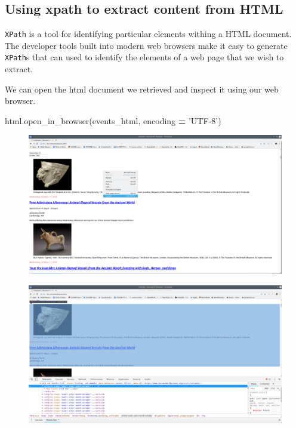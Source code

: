 \documentclass[]{book}
\newenvironment{Shaded}{\begin{snugshade}}{\end{snugshade}}
\newcommand{\StringTok}[1]{\textcolor[rgb]{0.31,0.60,0.02}{#1}}
\newcommand{\OperatorTok}[1]{\textcolor[rgb]{0.81,0.36,0.00}{\textbf{#1}}}
\newcommand{\NormalTok}[1]{#1}
\begin{document}
\subsection{Using xpath to extract content from
HTML}\label{using-xpath-to-extract-content-from-html}

\texttt{XPath} is a tool for identifying particular elements withing a
HTML document. The developer tools built into modern web browsers make
it easy to generate \texttt{XPath}s that can used to identify the
elements of a web page that we wish to extract.

We can open the html document we retrieved and inspect it using our web
browser.

\begin{Shaded}
\begin{Highlighting}[]
\NormalTok{html.open_in_browser(events_html, encoding }\OperatorTok{=} \StringTok{'UTF-8'}\NormalTok{)}
\end{Highlighting}
\end{Shaded}

\begin{figure}
\centering
\includegraphics{Python/PythonWebScrape/images/dev_tools_right_click.png}
\caption{}
\end{figure}

\begin{figure}
\centering
\includegraphics{Python/PythonWebScrape/images/dev_tools_inspect.png}
\caption{}
\end{figure}
\end{document}
